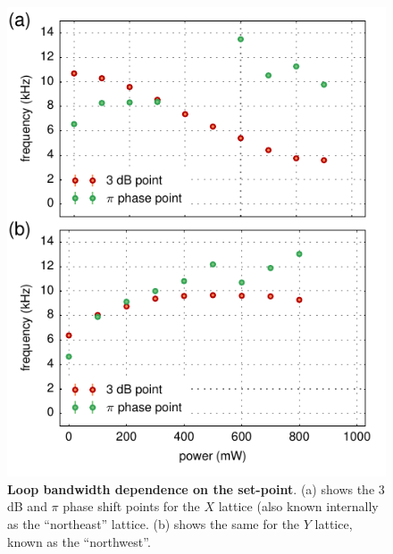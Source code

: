 \documentclass[twocolumn,aps,pra,showpacs,preprintnumbers,bibnotes]{revtex4-1}
\begin{document}
\begin{figure}
  \begin{center}
    \includegraphics{fig/low_power_bandwidths.pdf}
    \caption{\textbf{Loop bandwidth dependence on the set-point}. (a) shows the $3$ dB and $\pi$ phase shift points for the $X$ lattice (also known internally as the ``northeast'' lattice. (b) shows the same for the $Y$ lattice, known as the ``northwest''.}\label{fig:bandwidth}
  \end{center}
\end{figure}
\end{document}
